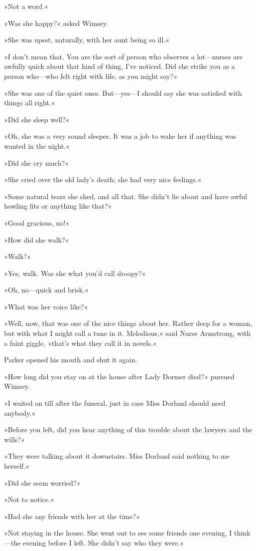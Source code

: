 »Not a word.«

»Was she happy?« asked Wimsey.

»She was upset, naturally, with her aunt being so ill.«

»I don't mean that. You are the sort of person who observes a lot—nurses are awfully quick about that kind of thing, I've noticed. Did she strike you as a person who—who felt right with life, as you might say?«

»She was one of the quiet ones. But—yes—I should say she was satisfied with things all right.«

»Did she sleep well?«

»Oh, she was a very sound sleeper. It was a job to wake her if anything was wanted in the night.«

»Did she cry much?«

»She cried over the old lady's death; she had very nice feelings.«

»Some natural tears she shed, and all that. She didn't lie about and have awful howling fits or anything like that?«

»Good gracious, no!«

»How did she walk?«

»Walk?«

»Yes, walk. Was she what you'd call droopy?«

»Oh, no—quick and brisk.«

»What was her voice like?«

»Well, now, that was one of the nice things about her. Rather deep for a woman, but with what I might call a tune in it. Melodious,« said Nurse Armstrong, with a faint giggle, »that's what they call it in novels.«

Parker opened his mouth and shut it again.

»How long did you stay on at the house after Lady Dormer died?« pursued Wimsey.

»I waited on till after the funeral, just in case Miss Dorland should need anybody.«

»Before you left, did you hear anything of this trouble about the lawyers and the wills?«

»They were talking about it downstairs. Miss Dorland said nothing to me herself.«

»Did she seem worried?«

»Not to notice.«

»Had she any friends with her at the time?«

»Not staying in the house. She went out to see some friends one evening, I think—the evening before I left. She didn't say who they were.«

